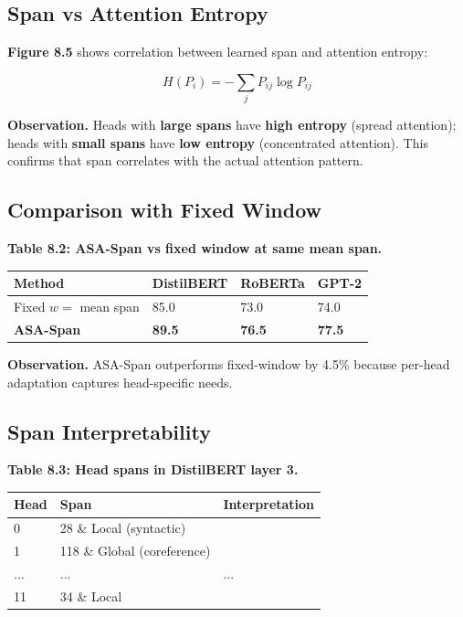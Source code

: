 \subsection{Span vs Attention Entropy}

\textbf{Figure 8.5} shows correlation between learned span and attention entropy:

\[
H(P_i) = -\sum_j P_{ij} \log P_{ij}
\]

\textbf{Observation.} Heads with \textbf{large spans} have \textbf{high entropy} (spread 
attention); heads with \textbf{small spans} have \textbf{low entropy} (concentrated 
attention). This confirms that span correlates with the actual attention 
pattern.

\subsection{Comparison with Fixed Window}

\textbf{Table 8.2: ASA-Span vs fixed window at same mean span.}

\begin{table}[H]
\centering
\small
\begin{tabular}{llll}
\toprule
\textbf{Method} & \textbf{DistilBERT} & \textbf{RoBERTa} & \textbf{GPT-2} \\
\midrule
Fixed $w = $ mean span & 85.0 & 73.0 & 74.0 \\
\textbf{ASA-Span} & \textbf{89.5} & \textbf{76.5} & \textbf{77.5} \\
\bottomrule
\end{tabular}
\end{table}

\textbf{Observation.} ASA-Span outperforms fixed-window by 4.5\% 
because per-head adaptation captures head-specific needs.

\subsection{Span Interpretability}

\textbf{Table 8.3: Head spans in DistilBERT layer 3.}

\begin{table}[H]
\centering
\small
\begin{tabular}{lll}
\toprule
\textbf{Head} & \textbf{Span} & \textbf{Interpretation} \\
\midrule
0 & 28 \& Local (syntactic) \\
1 & 118 \& Global (coreference) \\
... & ... & ... \\
11 & 34 \& Local \\
\bottomrule
\end{tabular}
\end{table}

